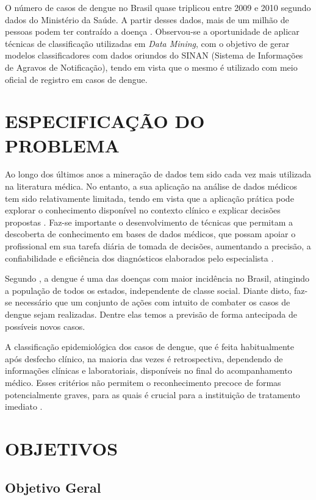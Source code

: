 \documentclass[
	12pt,				%
	openright,			%
	oneside,	
	a4paper,				%
	english,				%
	brazil				%
]{abntex2/abntex2} %
\begin{document}
	O número de casos de dengue no Brasil quase triplicou entre 2009 e 2010 segundo dados do Ministério da Saúde. A partir desses dados, mais de um milhão de pessoas podem ter contraído a doença \cite{santos:2011}. Observou-se a oportunidade de aplicar técnicas de classificação utilizadas em \textit{Data Mining}, com o objetivo de gerar modelos classificadores com dados oriundos do SINAN (Sistema de Informações de Agravos de Notificação), tendo em vista que o mesmo é utilizado com meio oficial de registro em casos de dengue.
    
    \newpage
	\section{ESPECIFICAÇÃO DO PROBLEMA}
		
		Ao longo dos últimos anos a mineração de dados tem sido cada vez mais utilizada na literatura médica. No entanto, a sua aplicação na análise de dados médicos tem sido relativamente limitada, tendo em vista que a aplicação prática pode explorar o conhecimento disponível no contexto clínico e explicar decisões propostas \cite{bellazzi:2008}. Faz-se importante o desenvolvimento de técnicas que permitam a descoberta de conhecimento em bases de dados médicos, que possam apoiar o profissional em sua tarefa diária de tomada de decisões, aumentando a precisão, a confiabilidade e eficiência dos diagnósticos elaborados pelo especialista \cite{costa:2012}.
		
		Segundo \cite{saude:2013}, a dengue é uma das doenças com maior incidência no Brasil, atingindo a população de todos os estados, independente de classe social. Diante disto, faz-se necessário que um conjunto de ações com intuito de combater os casos de dengue sejam realizadas. Dentre elas temos a previsão de forma antecipada de possíveis novos casos.
	
		A classificação epidemiológica dos casos de dengue, que é feita habitualmente após desfecho clínico, na maioria das vezes é retrospectiva, dependendo de informações clínicas e laboratoriais, disponíveis no final do acompanhamento médico. Esses critérios não permitem o reconhecimento precoce de formas potencialmente graves, para as quais é crucial para a instituição de tratamento imediato \cite{saude:2013}.

	\section{OBJETIVOS}
	
		\subsection{Objetivo Geral}
\end{document}
